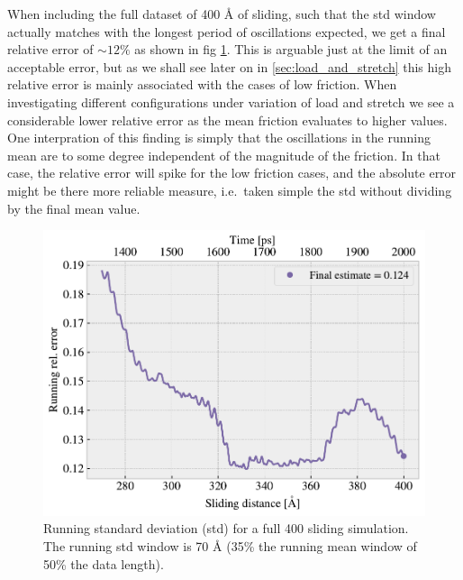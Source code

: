 When including the full dataset of 400 Å of sliding, such that the \acrshort{std} window actually matches with the longest period of oscillations expected, we get a final relative error of $\sim 12 \%$ as shown in fig \cref{fig:runstd_long}. This is arguable just at the limit of an acceptable error, but as we shall see later on in \cref{sec:load_and_stretch} this high relative error is mainly associated with the cases of low friction. When investigating different configurations under variation of load and stretch we see a considerable lower relative error as the mean friction evaluates to higher values. One interpration of this finding is simply that the oscillations in the running mean are to some degree independent of the magnitude of the friction. In that case, the relative error will spike for the low friction cases, and the absolute error might be there more reliable measure, i.e.\ taken simple the \acrshort{std} without dividing by the final mean value.


\begin{figure}[H]
  \centering
  \includegraphics[width=0.6\linewidth]{figures/baseline/Ff_runstd_long.pdf}
  \caption{Running standard deviation (std) for a full \SI{400}{{}} sliding simulation. The running std window is 70 Å (35\% the running mean window of 50\% the data length).}
  \label{fig:runstd_long}
\end{figure}


